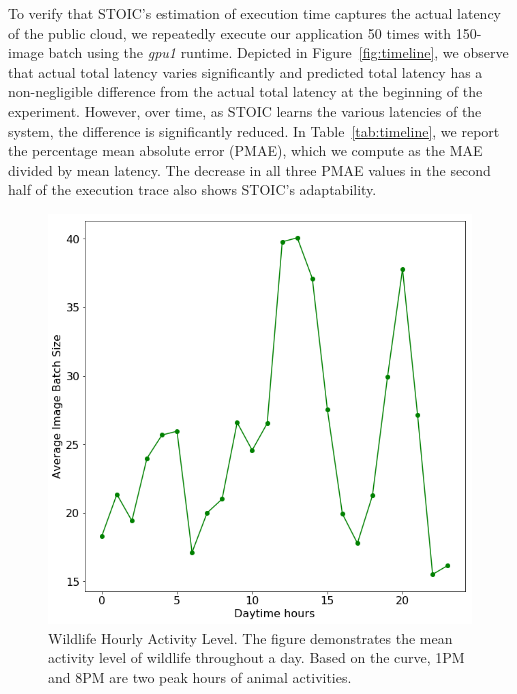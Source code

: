 To verify that STOIC's estimation of execution time captures the actual
latency of the public cloud, we repeatedly execute our application 50 times
with 150-image batch using the \textit{gpu1} runtime. Depicted in
Figure~\ref{fig:timeline}, we observe that actual total latency varies
significantly and predicted total latency has a non-negligible difference from
the actual total latency at the beginning of the experiment. However, over
time, as STOIC learns the various latencies of the system, the difference is
significantly reduced. In Table~\ref{tab:timeline}, we report the percentage
mean absolute error (PMAE), which we compute as the MAE divided by mean
latency. The decrease in all three PMAE values in the second half of the
execution trace also shows STOIC's adaptability.

\begin{figure}[t] \centering 
\includegraphics[scale=0.36]{figures/Hourly_act.png}
\caption{Wildlife Hourly Activity Level. The figure demonstrates the mean activity level of wildlife throughout a day. Based on the curve, 1PM and 8PM are two peak hours of animal activities.
\label{fig:hour_act}}
\end{figure} 
 
